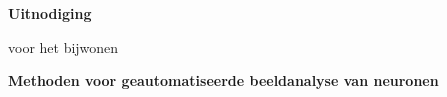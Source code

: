 \documentclass[10pt]{report}
\begin{document}
\pagestyle{empty}
\setlength{\leftmargini}{0em}

\begin{center}
  {\Large\bf Uitnodiging}

  \medskip

  voor het bijwonen

  \medskip

  {\Large\bf  Methoden voor geautomatiseerde beeldanalyse van neuronen}

  \medskip

\end{center}

\end{document}
